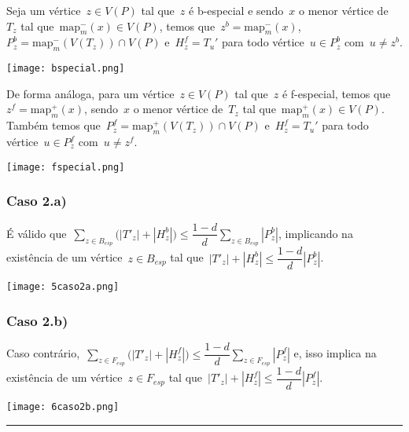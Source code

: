 \documentclass[a0,portrait]{a0poster}
\newcommand{\map}{\mathrm{map}}
\begin{document}
\begin{multicols}{3}
    \bigskip
    \bigskip

    Seja um vértice~${z\in V(P)}$ tal que~$z$ é b-especial e
    sendo~$x$ o menor vértice de~$T_z$ tal 
    que~${\map^-_m(x)\in V(P)}$, temos 
    que~${z^b = \map^-_m(x)}$,
    ~${P_z^b = \map^-_m(V(T_z))\cap V(P)}$
    e~${H_z^f =T_u'}$ para todo 
    vértice~${u\in P_z^b}$ com~${u\ne z^b}$.

    \begin{center}
\texttt{[image: bspecial.png]}
\end{center}

    \bigskip
    \bigskip

    De forma análoga, para um vértice~${z\in V(P)}$ tal 
    que~$z$ é f-especial,
    temos que~${z^f = \map^+_m(x)}$,
    sendo~$x$ o menor vértice de~$T_z$ tal 
    que~${\map^+_m(x)\in V(P)}$.
    Também temos
    que~${P_z^f = \map^+_m(V(T_z))\cap V(P)}$
    e~${H_z^f =T_u'}$ para todo 
    vértice~${u\in P_z^f}$ com~${u\ne z^f}$.

\begin{center}
    \texttt{[image: fspecial.png]}
\end{center}
    \subsubsection*{Caso 2.a)}
        É válido que~${\displaystyle\sum_{z\in B_{esp}}
        \Big(|T'_{z}|+|H_z^b|\Big)\le
        \dfrac{1-d}{d}\displaystyle\sum_{z\in B_{esp}}|P_z^b|}$,
        implicando na existência de um vértice~${z\in B_{esp}}$ 
        tal que~${|T'_{z}|+|H_z^b|\le
        \dfrac{1-d}{d}|P_z^b|}$.

\begin{center}
    \texttt{[image: 5caso2a.png]}
\end{center}
    \subsubsection*{Caso 2.b)}
        Caso contrário,~${\displaystyle\sum_{z\in F_{esp}}
        \Big(|T'_{z}|+|H_z^f|\Big)\le
        \dfrac{1-d}{d}\displaystyle\sum_{z\in F_{esp}}|P_z^f|}$
        e, isso implica na existência de um vértice~${z\in F_{esp}}$ 
        tal 
        que~${|T'_{z}|+|H_z^f|\le
        \dfrac{1-d}{d}|P_z^f|}$.

\begin{center}
\texttt{[image: 6caso2b.png]}
\end{center}
\noindent\rule[0.5ex]{\linewidth}{1pt}


\end{multicols}
\end{document}
